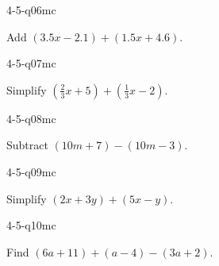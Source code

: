 \begin{practiceQuestion}{4-5-q06}{mc}
\begin{questionText}
Add $(3.5x - 2.1) + (1.5x + 4.6)$.
\end{questionText}
\end{practiceQuestion}

\begin{practiceQuestion}{4-5-q07}{mc}
\begin{questionText}
Simplify $\left(\frac{2}{3}x + 5\right) + \left(\frac{1}{3}x - 2\right)$.
\end{questionText}
\end{practiceQuestion}

\begin{practiceQuestion}{4-5-q08}{mc}
\begin{questionText}
Subtract $(10m + 7) - (10m - 3)$.
\end{questionText}
\end{practiceQuestion}

\begin{practiceQuestion}{4-5-q09}{mc}
\begin{questionText}
Simplify $(2x + 3y) + (5x - y)$.
\end{questionText}
\end{practiceQuestion}

\begin{practiceQuestion}{4-5-q10}{mc}
\begin{questionText}
Find $(6a + 11) + (a - 4) - (3a + 2)$.
\end{questionText}
\end{practiceQuestion}

